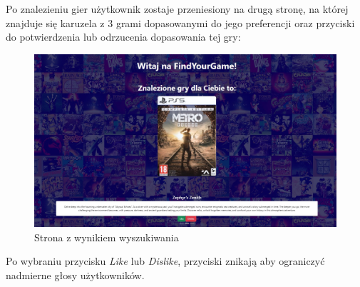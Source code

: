 Po znalezieniu gier użytkownik zostaje przeniesiony na drugą stronę, na której znajduje się karuzela z 3 grami dopasowanymi do jego preferencji oraz przyciski do potwierdzenia lub odrzucenia dopasowania tej gry:
\begin{figure}[h]
    \centering
    \includegraphics[width=1\linewidth]{./img/secondpage.jpg}
    \caption{Strona z wynikiem wyszukiwania}
    \label{fig:StronaWynik}
\end{figure}
Po wybraniu przycisku \textit{Like} lub \textit{Dislike}, przyciski znikają aby ograniczyć nadmierne głosy użytkowników.